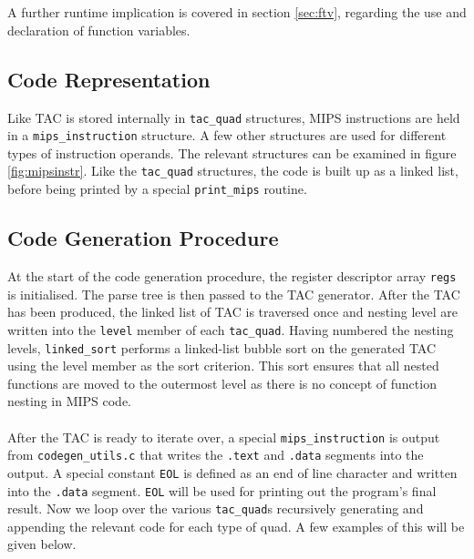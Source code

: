 \ \\ \ \\
A further runtime implication is covered in section \ref{sec:ftv}, regarding the use and declaration of function variables.
\subsection{Code Representation}
Like TAC is stored internally in \verb!tac_quad! structures, MIPS instructions are held in a \verb!mips_instruction! structure. A few other structures are used for different types of instruction operands. The relevant structures can be examined in figure \ref{fig:mipsinstr}. Like the \verb!tac_quad! structures, the code is built up as a linked list, before being printed by a special \verb!print_mips! routine.

\subsection{Code Generation Procedure}
At the start of the code generation procedure, the register descriptor array \verb!regs! is initialised. The parse tree is then passed to the TAC generator. After the TAC has been produced, the linked list of TAC is traversed once and nesting level are written into the \verb!level! member of each \verb!tac_quad!. Having numbered the nesting levels, \verb!linked_sort! performs a linked-list bubble sort on the generated TAC using the level member as the sort criterion. This sort ensures that all nested functions are moved to the outermost level as there is no concept of function nesting in MIPS code.
\ \\ \ \\
After the TAC is ready to iterate over, a special \verb!mips_instruction! is output from \verb!codegen_utils.c! that writes the \verb!.text! and \verb!.data! segments into the output. A special constant \verb!EOL! is defined as an end of line character and written into the \verb!.data! segment. \verb!EOL! will be used for printing out the program's final result. Now we loop over the various \verb!tac_quad!s recursively generating and appending the relevant code for each type of quad. A few examples of this will be given below.

